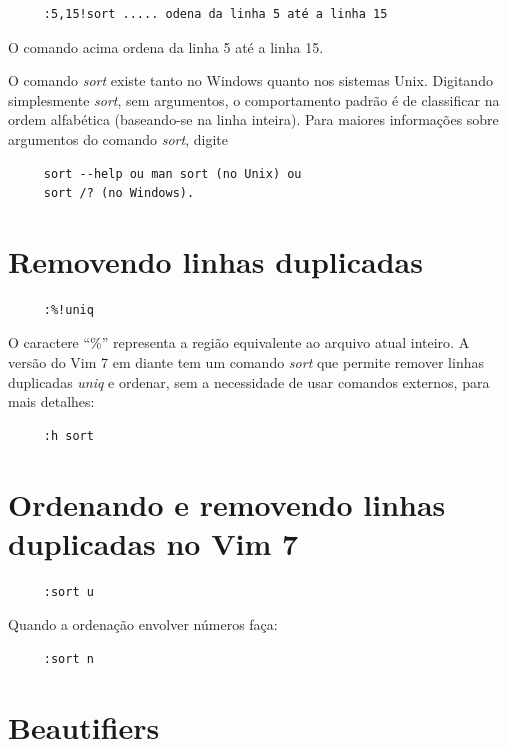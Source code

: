 \documentclass[10pt,a4paper,openany]{book}
\begin{document}
\begin{verbatim}
     :5,15!sort ..... odena da linha 5 até a linha 15
\end{verbatim}

O comando acima ordena da linha 5 até a linha 15.

O comando {\em sort} existe tanto no Windows quanto nos sistemas Unix.
Digitando simplesmente {\em sort}, sem argumentos, o comportamento padrão
é de classificar na ordem alfabética (baseando-se na linha inteira).
Para maiores informações sobre argumentos do comando {\em sort}, digite

\begin{verbatim}
     sort --help ou man sort (no Unix) ou
     sort /? (no Windows).
\end{verbatim}

\section{Removendo linhas duplicadas}

\begin{verbatim}
     :%!uniq
\end{verbatim}

O caractere ``\%'' representa a região equivalente ao arquivo atual inteiro.
A versão do Vim 7 em diante tem um comando {\em sort} que permite remover
linhas duplicadas {\em uniq} e ordenar, sem a necessidade de usar comandos
externos, para mais detalhes:

\begin{verbatim}
     :h sort
\end{verbatim}

\section{Ordenando e removendo linhas duplicadas no Vim 7}

\begin{verbatim}
     :sort u
\end{verbatim}

Quando a ordenação envolver números faça:

\begin{verbatim}
     :sort n
\end{verbatim}

\section{Beautifiers}
\end{document}
